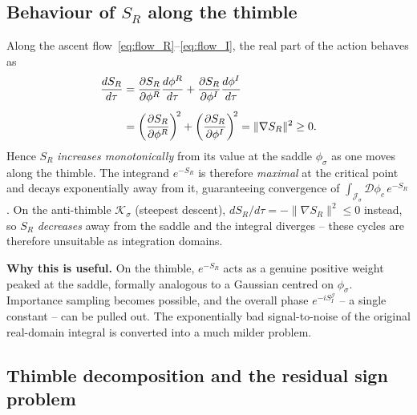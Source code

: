\documentclass[11pt]{article}
\theoremstyle{definition}
\begin{document}
\subsection{Behaviour of $S_R$ along the thimble}

Along the ascent flow~\eqref{eq:flow_R}--\eqref{eq:flow_I}, the real part
of the action behaves as
\begin{align}
  \frac{dS_R}{d\tau}
  &= \frac{\partial S_R}{\partial\phi^R}\frac{d\phi^R}{d\tau}
   + \frac{\partial S_R}{\partial\phi^I}\frac{d\phi^I}{d\tau} \notag\\[4pt]
  &= \left(\frac{\partial S_R}{\partial\phi^R}\right)^{\!2}
   + \left(\frac{\partial S_R}{\partial\phi^I}\right)^{\!2}
   = \|\nabla S_R\|^2 \geq 0 .
\end{align}
Hence $S_R$ \emph{increases monotonically} from its value at the saddle
$\phi_\sigma$ as one moves along the thimble. The integrand $e^{-S_R}$ is
therefore \emph{maximal} at the critical point and decays exponentially away
from it, guaranteeing convergence of $\int_{\mathcal{J}_\sigma}
\mathcal{D}\phi_c\,e^{-S_R}$. On the anti-thimble $\mathcal{K}_\sigma$
(steepest descent), $dS_R/d\tau = -\|\nabla S_R\|^2 \le 0$ instead, so $S_R$
\emph{decreases} away from the saddle and the integral diverges -- these
cycles are therefore unsuitable as integration domains.


\textbf{Why this is useful.} On the thimble, $e^{-S_R}$ acts as a genuine
positive weight peaked at the saddle, formally analogous to a Gaussian
centred on $\phi_\sigma$. Importance sampling becomes possible, and the
overall phase $e^{-iS_I^{\mathcal{J}}}$ -- a single constant -- can be pulled out.
The exponentially bad signal-to-noise of the original real-domain integral
is converted into a much milder problem.


\subsection{Thimble decomposition and the residual sign problem}
\end{document}
